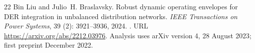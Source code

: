 \documentclass[UTF8,11pt,fontset=fandol,openany,oneside]{ctexbook}
\theoremstyle{definition}
\theoremstyle{remark}
\numberwithin{equation}{chapter}
\begin{document}
\begin{thebibliography}{22}
Bin Liu and Julio~H. Braslavsky.
\newblock Robust dynamic operating envelopes for {DER} integration in
  unbalanced distribution networks.
\newblock \emph{IEEE Transactions on Power Systems}, 39 (2):
  3921--3936, 2024.
\newblock {}.
\newblock URL \url{https://arxiv.org/abs/2212.03976}.
\newblock Analysis uses arXiv version 4, 28 August 2023; first preprint
  December 2022.

\end{thebibliography}
\end{document}
